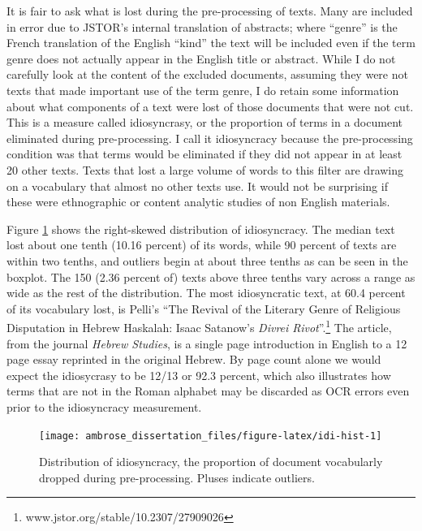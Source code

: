\documentclass[]{book}
\let\rmarkdownfootnote\footnote%
\def\footnote{\protect\rmarkdownfootnote}
\theoremstyle{definition}
\theoremstyle{definition}
\theoremstyle{definition}
\theoremstyle{remark}
\begin{document}
It is fair to ask what is lost during the pre-processing of texts. Many
are included in error due to JSTOR's internal translation of abstracts;
where ``genre'' is the French translation of the English ``kind'' the
text will be included even if the term genre does not actually appear in
the English title or abstract. While I do not carefully look at the
content of the excluded documents, assuming they were not texts that
made important use of the term genre, I do retain some information about
what components of a text were lost of those documents that were not
cut. This is a measure called idiosyncrasy, or the proportion of terms
in a document eliminated during pre-processing. I call it idiosyncracy
because the pre-processing condition was that terms would be eliminated
if they did not appear in at least 20 other texts. Texts that lost a
large volume of words to this filter are drawing on a vocabulary that
almost no other texts use. It would not be surprising if these were
ethnographic or content analytic studies of non English materials.

Figure \ref{fig:idi-hist} shows the right-skewed distribution of
idiosyncracy. The median text lost about one tenth (10.16 percent) of
its words, while 90 percent of texts are within two tenths, and outliers
begin at about three tenths as can be seen in the boxplot. The 150 (2.36
percent of) texts above three tenths vary across a range as wide as the
rest of the distribution. The most idiosyncratic text, at 60.4 percent
of its vocabulary lost, is Pelli's ``The Revival of the Literary Genre
of Religious Disputation in Hebrew Haskalah: Isaac Satanow's
\emph{Divrei Rivot}''.\footnote{www.jstor.org/stable/10.2307/27909026}
The article, from the journal \emph{Hebrew Studies}, is a single page
introduction in English to a 12 page essay reprinted in the original
Hebrew. By page count alone we would expect the idiosycrasy to be 12/13
or 92.3 percent, which also illustrates how terms that are not in the
Roman alphabet may be discarded as OCR errors even prior to the
idiosyncracy measurement.

\begin{figure}

{\centering \texttt{[image: ambrose\_dissertation\_files/figure-latex/idi-hist-1]} 

}

\caption{Distribution of idiosyncracy, the proportion of document vocabularly dropped during pre-processing. Pluses indicate outliers.}\label{fig:idi-hist}
\end{figure}
\end{document}
